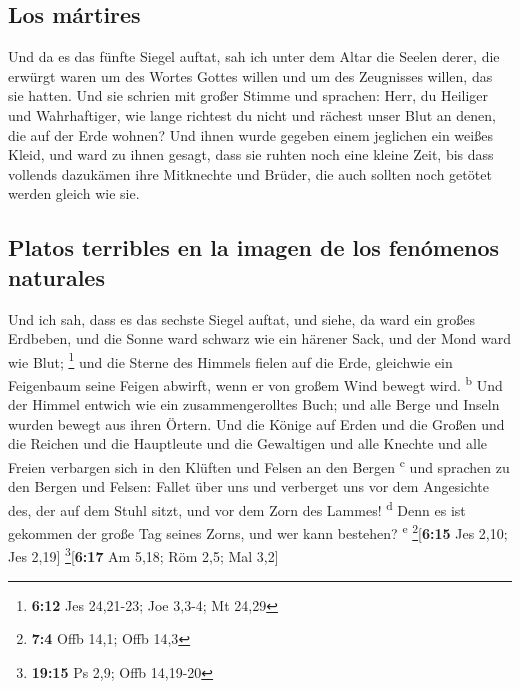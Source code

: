 \hypertarget{los-muxe1rtires}{%
\subsection{Los mártires}\label{los-muxe1rtires}}

 Und da es das fünfte Siegel auftat, sah ich unter dem
Altar die Seelen derer, die erwürgt waren um des Wortes Gottes willen
und um des Zeugnisses willen, das sie hatten.  Und sie
schrien mit großer Stimme und sprachen: Herr, du Heiliger und
Wahrhaftiger, wie lange richtest du nicht und rächest unser Blut an
denen, die auf der Erde wohnen?  Und ihnen wurde gegeben
einem jeglichen ein weißes Kleid, und ward zu ihnen gesagt, dass sie
ruhten noch eine kleine Zeit, bis dass vollends dazukämen ihre
Mitknechte und Brüder, die auch sollten noch getötet werden gleich wie
sie.

\hypertarget{platos-terribles-en-la-imagen-de-los-fenuxf3menos-naturales}{%
\subsection{Platos terribles en la imagen de los fenómenos
naturales}\label{platos-terribles-en-la-imagen-de-los-fenuxf3menos-naturales}}

 Und ich sah, dass es das sechste Siegel auftat, und
siehe, da ward ein großes Erdbeben, und die Sonne ward schwarz wie ein
härener Sack, und der Mond ward wie Blut; \footnote{\textbf{6:12} Jes
  24,21-23; Joe 3,3-4; Mt 24,29}  und die Sterne des
Himmels fielen auf die Erde, gleichwie ein Feigenbaum seine Feigen
abwirft, wenn er von großem Wind bewegt wird. \textsuperscript{b}
 Und der Himmel entwich wie ein zusammengerolltes Buch;
und alle Berge und Inseln wurden bewegt aus ihren Örtern.
 Und die Könige auf Erden und die Großen und die Reichen
und die Hauptleute und die Gewaltigen und alle Knechte und alle Freien
verbargen sich in den Klüften und Felsen an den Bergen
\textsuperscript{c}  und sprachen zu den Bergen und
Felsen: Fallet über uns und verberget uns vor dem Angesichte des, der
auf dem Stuhl sitzt, und vor dem Zorn des Lammes! \textsuperscript{d}
 Denn es ist gekommen der große Tag seines Zorns, und wer
kann bestehen? \textsuperscript{e} \footnote{\textbf{7:4} Offb 14,1;
  Offb 14,3}{[}\textbf{6:15} Jes 2,10; Jes 2,19{]}
\footnote{\textbf{19:15} Ps 2,9; Offb 14,19-20}{[}\textbf{6:17} Am 5,18;
Röm 2,5; Mal 3,2{]}

